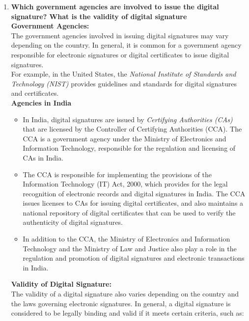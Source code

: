 \documentclass[openany]{book}
\begin{document}
\begin{enumerate}
    \item \textbf{Which government agencies are involved to issue the digital signature? What is the validity of digital signature}\\


          \textbf{Government Agencies:}\\

          The government agencies involved in issuing digital signatures may vary depending on the country. In general, it is common for a government agency responsible for electronic signatures or digital certificates to issue digital signatures. \\

          For example, in the United States, the \textit{National Institute of Standards and Technology (NIST)} provides guidelines and standards for digital signatures and certificates.\\
    

          \textbf{Agencies in India}
          \begin{itemize}
              \item In India, digital signatures are issued by \textit{Certifying Authorities (CAs)} that are licensed by the Controller of Certifying Authorities (CCA). The CCA is a government agency under the Ministry of Electronics and Information Technology, responsible for the regulation and licensing of CAs in India. \\

              \item    The CCA is responsible for implementing the provisions of the Information Technology (IT) Act, 2000, which provides for the legal recognition of electronic records and digital signatures in India. The CCA issues licenses to CAs for issuing digital certificates, and also maintains a national repository of digital certificates that can be used to verify the authenticity of digital signatures.

              \item In addition to the CCA, the Ministry of Electronics and Information Technology and the Ministry of Law and Justice also play a role in the regulation and promotion of digital signatures and electronic transactions in India.

          \end{itemize}
          \textbf{Validity of Digital Signature:}\\

          The validity of a digital signature also varies depending on the country and the laws governing electronic signatures. In general, a digital signature is considered to be legally binding and valid if it meets certain criteria, such as:
          \begin{enumerate}


\end{enumerate}
\end{enumerate}
\end{document}
